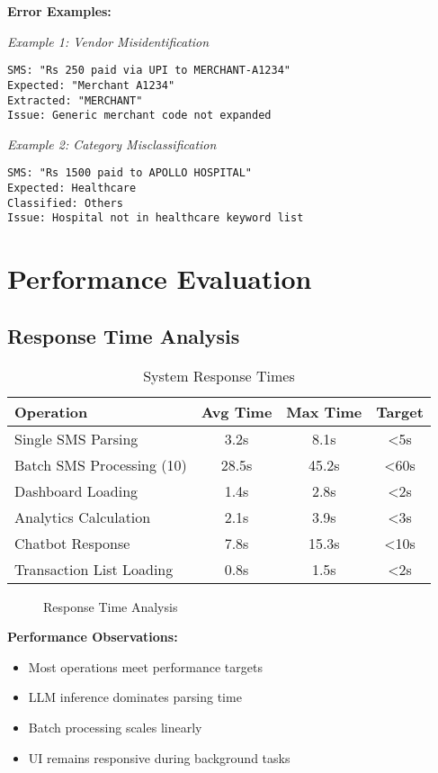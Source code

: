 \documentclass[11pt,a4paper]{report}
\begin{document}
\begin{itemize}
\begin{itemize}
\textbf{Error Examples:}

\textit{Example 1: Vendor Misidentification}
\begin{lstlisting}
SMS: "Rs 250 paid via UPI to MERCHANT-A1234"
Expected: "Merchant A1234"
Extracted: "MERCHANT"
Issue: Generic merchant code not expanded
\end{lstlisting}

\textit{Example 2: Category Misclassification}
\begin{lstlisting}
SMS: "Rs 1500 paid to APOLLO HOSPITAL"
Expected: Healthcare
Classified: Others
Issue: Hospital not in healthcare keyword list
\end{lstlisting}

\section{Performance Evaluation}

\subsection{Response Time Analysis}

\begin{table}[H]
\centering
\caption{System Response Times}
\begin{tabular}{|l|c|c|c|}
\hline
\textbf{Operation} & \textbf{Avg Time} & \textbf{Max Time} & \textbf{Target} \\
\hline
Single SMS Parsing & 3.2s & 8.1s & <5s \\
Batch SMS Processing (10) & 28.5s & 45.2s & <60s \\
Dashboard Loading & 1.4s & 2.8s & <2s \\
Analytics Calculation & 2.1s & 3.9s & <3s \\
Chatbot Response & 7.8s & 15.3s & <10s \\
Transaction List Loading & 0.8s & 1.5s & <2s \\
\hline
\end{tabular}
\end{table}

\begin{figure}[H]
    \centering
    \caption{Response Time Analysis}
    \label{fig:response_time}
\end{figure}

\textbf{Performance Observations:}
\begin{itemize}
    \item Most operations meet performance targets
    \item LLM inference dominates parsing time
    \item Batch processing scales linearly
    \item UI remains responsive during background tasks
\end{itemize}


\end{itemize}
\end{itemize}
\end{document}
